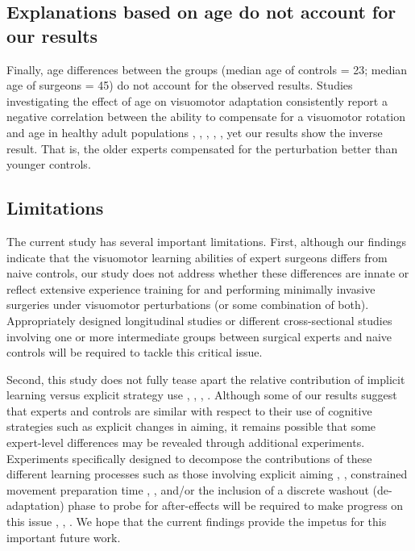 \documentclass[man, 11pt, longtable, floatsintext, notab]{apa6}
\begin{document}
\subsection{Explanations based on age do not account 
    for our results}
Finally, age differences between the groups (median age of
controls = 23; median age of surgeons = 45) do not account
for the observed results. Studies investigating the effect
of age on visuomotor adaptation consistently report a
negative correlation between the ability to compensate for a
visuomotor rotation and age in healthy adult populations
\cite{anguera_failure_2011},
\cite{seidler_differential_2006},
\cite{voelcker-rehage_motor-skill_2008},
\cite{king_neural_2013}, \cite{buch_visuomotor_2003}, yet
our results show the inverse result. That is, the older
experts compensated for the perturbation better than younger
controls.

\subsection{Limitations}
The current study has several important limitations. First,
although our findings indicate that the visuomotor learning
abilities of expert surgeons differs from naive controls,
our study does not address whether these differences are
innate or reflect extensive experience training for and
performing minimally invasive surgeries under visuomotor
perturbations (or some combination of both). Appropriately
designed longitudinal studies or different cross-sectional
studies involving one or more intermediate groups between
surgical experts and naive controls will be required to
tackle this critical issue.

Second, this study does not fully tease apart the relative
contribution of implicit learning versus explicit strategy
use \cite{smith_interacting_2006},
\cite{mcdougle_taking_2016}, \cite{mazzoni_implicit_2006},
\cite{taylor_explicit_2014}. Although some of our results
suggest that experts and controls are similar with respect
to their use of cognitive strategies such as explicit
changes in aiming, it remains possible that some
expert-level differences may be revealed through additional
experiments. Experiments specifically designed to decompose
the contributions of these different learning processes such
as those involving explicit aiming
\cite{taylor_explicit_2014}, \cite{bond_flexible_2015},
constrained movement preparation time
\cite{haith_influence_2015}, \cite{leow_estimating_2017},
and/or the inclusion of a discrete washout (de-adaptation)
phase to probe for after-effects
\cite{smith_interacting_2006} will be required to make
progress on this issue \cite{mcdougle_taking_2016},
\cite{mazzoni_implicit_2006}, \cite{taylor_explicit_2014}.
We hope that the current findings provide the impetus for
this important future work.
\end{document}
